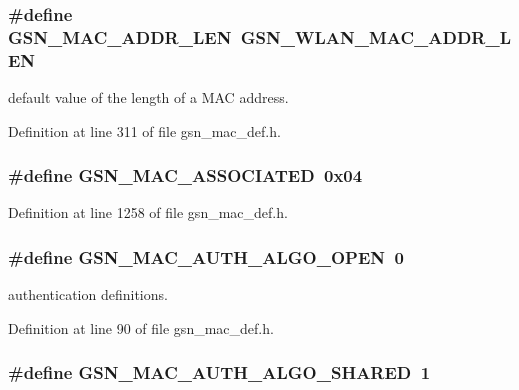 \hypertarget{a00642_gaeeeab57b53de2e9a366c2b883e008f5e}{
\subsubsection[{GSN\_\-MAC\_\-ADDR\_\-LEN}]{\setlength{\rightskip}{0pt plus 5cm}\#define GSN\_\-MAC\_\-ADDR\_\-LEN~GSN\_\-WLAN\_\-MAC\_\-ADDR\_\-LEN}}
\label{a00642_gaeeeab57b53de2e9a366c2b883e008f5e}


default value of the length of a MAC address. 



Definition at line 311 of file gsn\_\-mac\_\-def.h.

\hypertarget{a00642_gac95d79b5108d9696c78d41bf0bfc5f62}{
\subsubsection[{GSN\_\-MAC\_\-ASSOCIATED}]{\setlength{\rightskip}{0pt plus 5cm}\#define GSN\_\-MAC\_\-ASSOCIATED~0x04}}
\label{a00642_gac95d79b5108d9696c78d41bf0bfc5f62}


Definition at line 1258 of file gsn\_\-mac\_\-def.h.

\hypertarget{a00642_gacd47816d50e57aeb3b85dfdedc358f68}{
\subsubsection[{GSN\_\-MAC\_\-AUTH\_\-ALGO\_\-OPEN}]{\setlength{\rightskip}{0pt plus 5cm}\#define GSN\_\-MAC\_\-AUTH\_\-ALGO\_\-OPEN~0}}
\label{a00642_gacd47816d50e57aeb3b85dfdedc358f68}


authentication definitions. 



Definition at line 90 of file gsn\_\-mac\_\-def.h.

\hypertarget{a00642_gaed7a52fc252b37b7c3959abe9f1ae41d}{
\subsubsection[{GSN\_\-MAC\_\-AUTH\_\-ALGO\_\-SHARED}]{\setlength{\rightskip}{0pt plus 5cm}\#define GSN\_\-MAC\_\-AUTH\_\-ALGO\_\-SHARED~1}}
\label{a00642_gaed7a52fc252b37b7c3959abe9f1ae41d}


